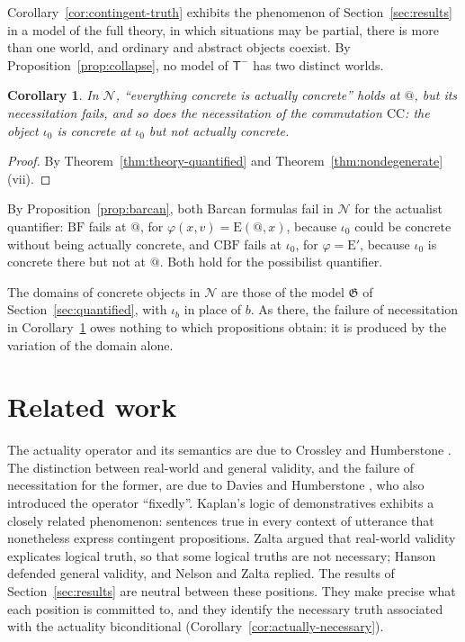 \documentclass[11pt]{amsart}
\makeatletter
\theoremstyle{plain}
\newtheorem{corollary}[theorem]{Corollary}
\theoremstyle{definition}
\theoremstyle{remark}
\newcommand{\at}{@}
\newcommand{\Conc}{\mathrm{E}}
\newcommand{\T}{\mathsf{T}}
\newcommand{\N}{\mathcal{N}}
\makeatother
\begin{document}
Corollary~\ref{cor:contingent-truth} exhibits the phenomenon of
Section~\ref{sec:results} in a model of the full theory, in which
situations may be partial, there is more than one world, and ordinary
and abstract objects coexist. By Proposition~\ref{prop:collapse}, no
model of $\T^-$ has two distinct worlds.

\begin{corollary}
\label{cor:q-contingent-truth}
In $\N$, ``everything concrete is actually concrete'' holds at $\at$,
but its necessitation fails, and so does the necessitation of the
commutation $\mathrm{CC}$: the object $\iota_0$ is concrete at
$\iota_0$ but not actually concrete.
\end{corollary}

\begin{proof}
By Theorem~\ref{thm:theory-quantified} and
Theorem~\ref{thm:nondegenerate}(vii).
\end{proof}

By Proposition~\ref{prop:barcan}, both Barcan formulas fail in $\N$
for the actualist quantifier: $\mathrm{BF}$ fails at $\at$, for
$\varphi(x,v) = \Conc(\at,x)$, because $\iota_0$ could be concrete
without being actually concrete, and $\mathrm{CBF}$ fails at
$\iota_0$, for $\varphi = \Conc'$, because $\iota_0$ is concrete there
but not at $\at$. Both hold for the possibilist quantifier.

The domains of concrete objects in $\N$ are those of the model
$\mathfrak{G}$ of Section~\ref{sec:quantified}, with $\iota_b$ in place
of $b$. As there, the failure of necessitation in
Corollary~\ref{cor:q-contingent-truth} owes nothing to which
propositions obtain: it is produced by the variation of the domain
alone.

\section{Related work}
\label{sec:related}

The actuality operator and its semantics are due to Crossley and
Humberstone \cite{crossley1977}. The distinction between real-world and
general validity, and the failure of necessitation for the former, are
due to Davies and Humberstone \cite{davies1980}, who also introduced the
operator ``fixedly''. Kaplan's logic of demonstratives
\cite{kaplan1989} exhibits a closely related phenomenon: sentences true
in every context of utterance that nonetheless express contingent
propositions. Zalta \cite{zalta1988} argued that real-world validity
explicates logical truth, so that some logical truths are not
necessary; Hanson \cite{hanson2006} defended general validity, and
Nelson and Zalta \cite{nelson2012} replied. The results of
Section~\ref{sec:results} are neutral between these positions. They
make precise what each position is committed to, and they identify the
necessary truth associated with the actuality biconditional
(Corollary~\ref{cor:actually-necessary}).
\end{document}
